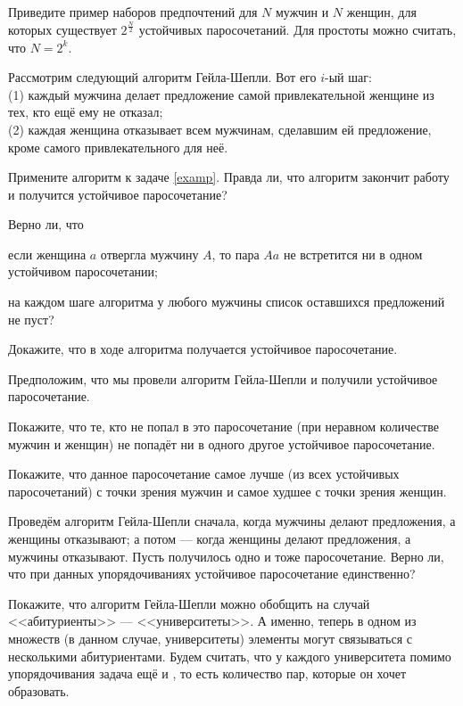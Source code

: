 \documentclass[a4paper,11pt]{article}
\begin{document}

 Приведите пример наборов предпочтений для $N$ мужчин и $N$ женщин, для которых существует $2^{\frac{N}{2}}$ устойчивых паросочетаний. Для простоты можно считать, что $N=2^k$.

\vspace*{-4mm}


Рассмотрим следующий алгоритм Гейла-Шепли. Вот его $i$-ый шаг:
\\(1) каждый мужчина делает предложение самой привлекательной женщине из тех, кто ещё ему не отказал;
\\(2) каждая женщина отказывает всем мужчинам, сделавшим ей предложение, кроме самого привлекательного для неё.

 Примените алгоритм к задаче \ref{examp}. Правда ли, что алгоритм закончит работу и получится устойчивое паросочетание?

Верно ли, что


 если женщина $a$ отвергла мужчину $A$, то пара $Aa$ не встретится ни в одном устойчивом паросочетании;

 на каждом шаге алгоритма у любого мужчины список оставшихся предложений не пуст?

 Докажите, что в ходе алгоритма получается устойчивое паросочетание.


 Предположим, что мы провели алгоритм Гейла-Шепли и получили устойчивое паросочетание.

 Покажите, что те, кто не попал в это паросочетание (при неравном количестве мужчин и женщин) не попадёт ни в одного другое устойчивое паросочетание.

 Покажите, что данное паросочетание самое лучше (из всех устойчивых паросочетаний) с точки зрения мужчин и самое худшее с точки зрения женщин.

 Проведём алгоритм Гейла-Шепли сначала, когда мужчины делают предложения, а женщины отказывают;  а потом --- когда женщины делают предложения, а мужчины отказывают. Пусть получилось одно и тоже паросочетание. Верно ли, что при данных упорядочиваниях устойчивое паросочетание единственно?


 Покажите, что алгоритм Гейла-Шепли можно обобщить на случай <<абитуриенты>> --- <<университеты>>. А именно, теперь в одном из множеств (в данном случае, университеты) элементы могут связываться с несколькими абитуриентами. Будем считать, что у каждого университета помимо упорядочивания задача ещё и  , то есть количество пар, которые он хочет образовать.
\end{document}
